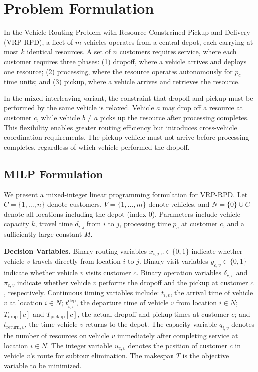 \documentclass{article}
\begin{document}
\section{Problem Formulation}

In the Vehicle Routing Problem with Resource-Constrained Pickup and Delivery (VRP-RPD), a fleet of $m$ vehicles operates from a central depot, each carrying at most $k$ identical resources. A set of $n$ customers requires service, where each customer requires three phases: (1) dropoff, where a vehicle arrives and deploys one resource; (2) processing, where the resource operates autonomously for $p_c$ time units; and (3) pickup, where a vehicle arrives and retrieves the resource. 

In the mixed interleaving variant, the constraint that dropoff and pickup must be performed by the same vehicle is relaxed. Vehicle $a$ may drop off a resource at customer $c$, while vehicle $b \neq a$ picks up the resource after processing completes. This flexibility enables greater routing efficiency but introduces cross-vehicle coordination requirements. The pickup vehicle must not arrive before processing completes, regardless of which vehicle performed the dropoff.

\subsection{MILP Formulation}

We present a mixed-integer linear programming formulation for VRP-RPD. Let
$C=\{1,\ldots,n\}$ denote customers, $V=\{1,\ldots,m\}$ denote vehicles, and
$N=\{0\}\cup C$ denote all locations including the depot (index $0$).
Parameters include vehicle capacity $k$, travel time $d_{i,j}$ from $i$ to $j$,
processing time $p_c$ at customer $c$, and a sufficiently large constant $M$.

\textbf{Decision Variables.}
Binary routing variables $x_{i,j,v}\in\{0,1\}$ indicate whether vehicle $v$
travels directly from location $i$ to $j$.
Binary visit variables $y_{c,v}\in\{0,1\}$ indicate whether vehicle $v$ visits
customer $c$.
Binary operation variables $\delta_{c,v}$ and $\pi_{c,v}$ indicate whether
vehicle $v$ performs the dropoff and the pickup at customer $c$, respectively.
Continuous timing variables include: $t_{i,v}$, the arrival time of vehicle $v$
at location $i\in N$; $t^{\text{dep}}_{i,v}$, the departure time of vehicle $v$
from location $i\in N$; $T_{\text{drop}}[c]$ and $T_{\text{pickup}}[c]$, the
actual dropoff and pickup times at customer $c$; and $t_{\text{return},v}$, the
time vehicle $v$ returns to the depot. The capacity variable $q_{i,v}$ denotes the number of resources on vehicle $v$ immediately after completing service at location $i\in N$.
The integer variable $u_{c,v}$ denotes the position of customer $c$ in vehicle $v$'s
route for subtour elimination. The makespan $T$ is the objective variable to be minimized.
\end{document}
